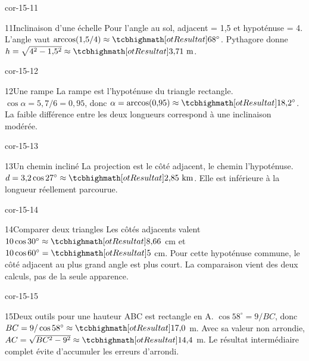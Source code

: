 \begin{blocLivre}{cor-15-11}\begin{corrige}{11}{Inclinaison d’une échelle}
Pour l’angle au sol, adjacent = 1,5 et hypoténuse = 4. L’angle vaut $\arccos(1{,}5/4)\approx\res{68^\circ}$. Pythagore donne $h=\sqrt{4^2-1{,}5^2}\approx\res{3{,}71\ \mathrm m}$.
\label{fig-cor-15-11}
\end{corrige}\end{blocLivre}
\begin{blocLivre}{cor-15-12}\begin{corrige}{12}{Une rampe}
La rampe est l’hypoténuse du triangle rectangle. $\cos\alpha=5{,}7/6=0{,}95$, donc $\alpha=\arccos(0{,}95)\approx\res{18{,}2^\circ}$. La faible différence entre les deux longueurs correspond à une inclinaison modérée.
\label{fig-cor-15-12}
\end{corrige}\end{blocLivre}
\begin{blocLivre}{cor-15-13}\begin{corrige}{13}{Un chemin incliné}
La projection est le côté adjacent, le chemin l’hypoténuse. $d=3{,}2\cos27^\circ\approx\res{2{,}85\ \mathrm{km}}$. Elle est inférieure à la longueur réellement parcourue.
\label{fig-cor-15-13}
\end{corrige}\end{blocLivre}
\begin{blocLivre}{cor-15-14}\begin{corrige}{14}{Comparer deux triangles}
Les côtés adjacents valent $10\cos30^\circ\approx\res{8{,}66}$ cm et $10\cos60^\circ=\res5$ cm. Pour cette hypoténuse commune, le côté adjacent au plus grand angle est plus court. La comparaison vient des deux calculs, pas de la seule apparence.
\label{fig-cor-15-14}
\end{corrige}\end{blocLivre}
\begin{blocLivre}{cor-15-15}\begin{corrige}{15}{Deux outils pour une hauteur}
ABC est rectangle en A. $\cos58^\circ=9/BC$, donc $BC=9/\cos58^\circ\approx\res{17{,}0}$ m. Avec sa valeur non arrondie, $AC=\sqrt{BC^2-9^2}\approx\res{14{,}4}$ m. Le résultat intermédiaire complet évite d’accumuler les erreurs d’arrondi.
\label{fig-cor-15-15}
\end{corrige}\end{blocLivre}
